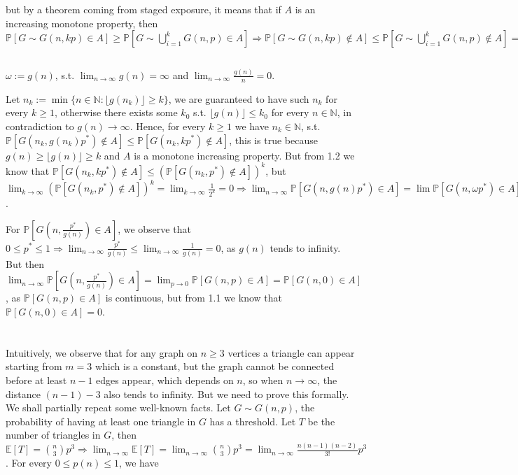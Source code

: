 \documentclass{article}
\begin{document}
but by a theorem coming from staged exposure, it means that if $A$ is an increasing monotone property, then $\mathbb{P}[G\sim{G(n,kp)}\in{A}]\geq{\mathbb{P}[G\sim\bigcup_{i=1}^{k}G(n,p)\in{A}]}\Rightarrow{\mathbb{P}[G\sim{G(n,kp)}\notin{A}]\leq{\mathbb{P}[G\sim\bigcup_{i=1}^{k}G(n,p)\notin{A}]}=(\mathbb{P}[G\sim{G(n,p)}\notin{A}]})^k$

\subsection{}
$\omega:=g(n)$, s.t. $\lim_{n\rightarrow\infty}g(n)=\infty$ and $\lim_{n\rightarrow\infty}\frac{g(n)}{n}=0$.

Let $n_k:=\min\{n\in\mathbb{N} : \lfloor{g(n_k)}\rfloor\geq{k}\}$, we are guaranteed to have such $n_k$ for every $k\geq{1}$, otherwise there exists some $k_0$ s.t. $\lfloor{g(n)}\rfloor\leq{k_0}$ for every $n\in\mathbb{N}$, in contradiction to $g(n)\rightarrow\infty$. 
Hence, for every $k\geq{1}$ we have $n_k\in\mathbb{N}$, s.t. $\mathbb{P}[G(n_k,g(n_k)p^{\ast})\notin{A}]\leq{\mathbb{P}[G(n_k,kp^{\ast})\notin{A}]}$, this is true because $g(n)\geq\lfloor{g(n)}\rfloor\geq{k}$ and $A$ is a monotone increasing property. But from 1.2 we know that $\mathbb{P}[G(n_k,kp^{\ast})\notin{A}]\leq{(\mathbb{P}[G(n_k,p^{\ast})\notin{A}])^k}$, but $\lim_{k\rightarrow\infty}(\mathbb{P}[G(n_k,p^{\ast})\notin{A}])^k=\lim_{k\rightarrow\infty}\frac{1}{2^k}=0\Rightarrow{\lim_{n\rightarrow\infty}\mathbb{P}[G(n,g(n){p^{\ast}})\in{A}]}=\lim\mathbb{P}[G(n,\omega{p^{\ast}})\in{A}]=1$.

For $\mathbb{P}[G(n,\frac{p^{\ast}}{g(n)})\in{A}]$, we observe that $0\leq{p^{\ast}}\leq{1}\Rightarrow{\lim_{n\rightarrow\infty}\frac{p^{\ast}}{g(n)}}\leq{\lim_{n\rightarrow\infty}\frac{1}{g(n)}}=0$, as $g(n)$ tends to infinity.
But then $\lim_{n\rightarrow\infty}\mathbb{P}[G(n,\frac{p^{\ast}}{g(n)})\in{A}]=\lim_{p\rightarrow{0}}\mathbb{P}[G(n,p)\in{A}]=\mathbb{P}[G(n,0)\in{A}]$, as $\mathbb{P}[G(n,p)\in{A}]$ is continuous, but from 1.1 we know that $\mathbb{P}[G(n,0)\in{A}]=0$.

\section{}
Intuitively, we observe that for any graph on $n\geq{3}$ vertices a triangle can appear starting from $m=3$ which is a constant, but the graph cannot be connected before at least $n-1$ edges appear, which depends on $n$, so when $n\rightarrow\infty$, the distance $(n-1)-3$ also tends to infinity. But we need to prove this formally.
We shall partially repeat some well-known facts. Let $G\sim{G(n,p)}$, the probability of having at least one triangle in $G$ has a threshold. Let $T$ be the number of triangles in $G$, then $\mathbb{E}[T]=\binom{n}{3}p^3\Rightarrow{\lim_{n\rightarrow\infty}}\mathbb{E}[T]=\lim_{n\rightarrow\infty}\binom{n}{3}p^3=\lim_{n\rightarrow\infty}\frac{n(n-1)(n-2)}{3!}p^3$. For every $0\leq{p(n)}\leq{1}$, we have 
\end{document}
